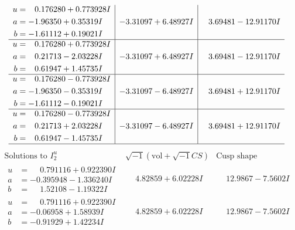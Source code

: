 \documentclass[1p]{elsarticle_modified}
\theoremstyle{definition}
\newcommand{\I}{\sqrt{-1}}
\begin{document}
$$\begin{array}{c|c|c}
\begin{aligned}
u &= \phantom{-}0.176280 + 0.773928 I \\
a &= -1.96350 + 0.35319 I \\
b &= -1.61112 + 0.19021 I\end{aligned}
 & -3.31097 + 6.48927 I & \phantom{-}3.69481 - 12.91170 I \\ \hline\begin{aligned}
u &= \phantom{-}0.176280 + 0.773928 I \\
a &= \phantom{-}0.21713 - 2.03228 I \\
b &= \phantom{-}0.61947 + 1.45735 I\end{aligned}
 & -3.31097 + 6.48927 I & \phantom{-}3.69481 - 12.91170 I \\ \hline\begin{aligned}
u &= \phantom{-}0.176280 - 0.773928 I \\
a &= -1.96350 - 0.35319 I \\
b &= -1.61112 - 0.19021 I\end{aligned}
 & -3.31097 - 6.48927 I & \phantom{-}3.69481 + 12.91170 I \\ \hline\begin{aligned}
u &= \phantom{-}0.176280 - 0.773928 I \\
a &= \phantom{-}0.21713 + 2.03228 I \\
b &= \phantom{-}0.61947 - 1.45735 I\end{aligned}
 & -3.31097 - 6.48927 I & \phantom{-}3.69481 + 12.91170 I\\
 \hline 
 \end{array}$$\newpage$$\begin{array}{c|c|c}  
\text{Solutions to }I^u_{2}& \I (\text{vol} + \sqrt{-1}CS) & \text{Cusp shape}\\
 \hline 
\begin{aligned}
u &= \phantom{-}0.791116 + 0.922390 I \\
a &= -0.395948 - 1.336240 I \\
b &= \phantom{-}1.52108 - 1.19322 I\end{aligned}
 & \phantom{-}4.82859 + 6.02228 I & \phantom{-}12.9867 - 7.5602 I \\ \hline\begin{aligned}
u &= \phantom{-}0.791116 + 0.922390 I \\
a &= -0.06958 + 1.58939 I \\
b &= -0.91929 + 1.42234 I\end{aligned}
 & \phantom{-}4.82859 + 6.02228 I & \phantom{-}12.9867 - 7.5602 I \\ \hline\begin{aligned}

\end{aligned}
\end{array}$$
\end{document}
